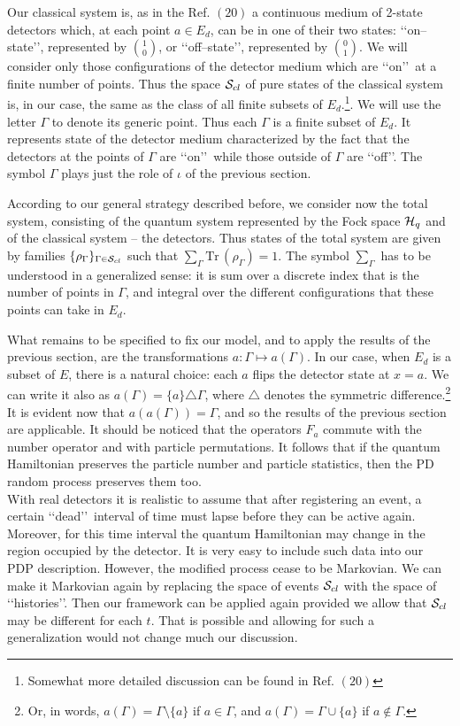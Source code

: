 \documentclass[12pt]{article}
\def\hq{{\cal H}_q}
\def\cs{{\cal S}_{cl}}
\def\tr{\mbox{Tr}\, }
\def\lqq{\lq\lq}
\def\rqq{\rq\rq}
\begin{document}
Our classical system is, as in the Ref. $(20)$ a continuous medium of
2-state detectors which, at each point $a\in E_d$, can be in one of
their two states: \lqq on--state\rqq, represented by ${1\choose0}$, or
\lqq off--state\rqq, represented by ${0\choose1}$. We will consider only
those
configurations of the detector medium which are \lqq on\rqq\,  at a finite
number
of points. Thus the space $\cs$ of pure states of the classical system
is, in our case, the same as the class of all finite subsets of
$E_d$.\footnote{Somewhat more detailed discussion can be found in Ref.
$(20)$}. We will use the letter $\Gamma$ to denote its generic point.
Thus each $\Gamma$ is a finite subset of $E_d$. It represents state of
the detector medium characterized by the fact that the detectors at the
points of $\Gamma$ are \lqq on\rqq\,  while those outside of $\Gamma$ are
\lqq off\rqq.
The symbol $\Gamma$ plays just the role of $\iota$ of the previous
section.

According to our general strategy described before, we consider now the
total system, consisting of the quantum system represented by the Fock
space $\hq$ and of the classical system -- the detectors. Thus states of
the total system are given by families $\{\rho_\Gamma\}_{\Gamma\in\cs}$
such that $\sum_\Gamma \tr (\rho_\Gamma)=1$. The symbol $\sum_\Gamma$
has to be understood in a generalized sense: it is sum over a discrete
index that is the number of points in $\Gamma$, and integral over the
different configurations that these points can take in $E_d$.

What remains to be specified to fix our model, and to apply the results
of the previous section, are the transformations $a:\Gamma\longmapsto
a(\Gamma)$. In our case, when $E_d$ is a subset of $E$, there is a
natural choice: each $a$ flips the detector state at $x=a$. We can write
it also as $a(\Gamma)=\{a\}{\scriptstyle\triangle} \Gamma$, where
${\scriptstyle\triangle}$ denotes the symmetric difference.\footnote{Or,
in words, $a(\Gamma)=
\Gamma\setminus\{a\}$ if $a\in \Gamma$, and $a(\Gamma)=\Gamma\cup\{a\}$
if $a\notin \Gamma$.} It is evident now that $a(a(\Gamma))=\Gamma$, and
so the results of the previous section are applicable. It should be
noticed that the operators $F_a$ commute with the number operator and
with particle permutations. It
follows that if the quantum Hamiltonian preserves the particle number
and particle statistics, then the PD random process preserves them too.
\medskip\\
With real detectors it is realistic to assume that after registering an
event, a certain \lqq dead\rqq\,  interval of time must lapse before they
can
be active again. Moreover, for this time interval the quantum Hamiltonian
may change in the region occupied by the detector. It is very easy to
include such data into our PDP  description. However, the modified
process cease to be Markovian. We can make it Markovian again by
replacing the space of events $\cs$ with the space of \lqq histories\rq\rq.
Then
our framework can be applied again provided we allow that $\cs$ may be
different for each $t$. That is possible and allowing for such a
generalization would not change much our discussion.
\end{document}
